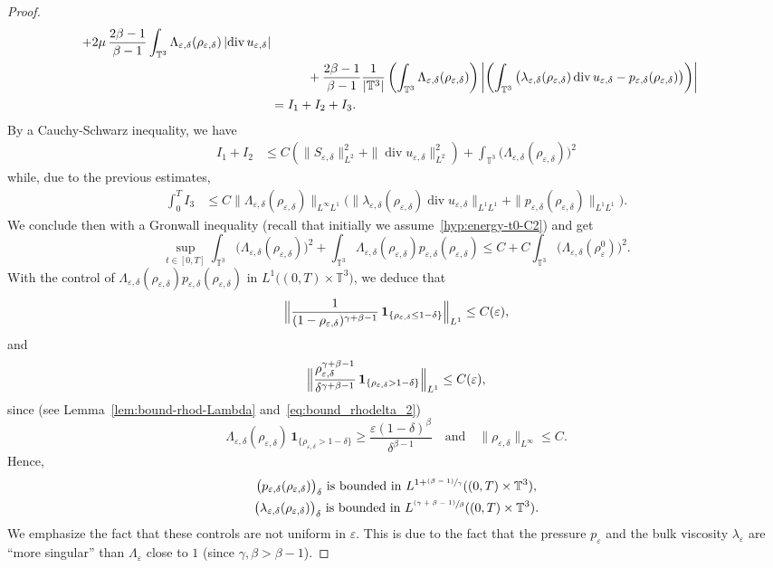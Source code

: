 \documentclass[10pt]{amsart}
\newcommand{\<}{\bigl\langle}
\renewcommand{\>}{\bigr\rangle}
\newcommand{\psfrac}[2]{\sfrac{(#1)}{#2}}
\newcommand{\labeleq}[1]{}
\theoremstyle{definition}
\theoremstyle{remark}
\newcommand{\TT}{\mathbb{T}^3}
\DeclareMathOperator{\Div}{div}
\let\ep\varepsilon
\begin{document}
\begin{proof}
\begin{align*}
+ 2\mu\,\dfrac{2\beta -1}{\beta-1} \int_{\TT}{\Lambda_{\ep,\delta}(\rho_{\ep,\delta})\,
| {\Div u_{\ep,\delta}}|} \\
&
\hspace*{1cm}+ \dfrac{2\beta -1}{\beta-1} \dfrac{1}{|\TT|}\left(\int_{\TT}{\Lambda_{\ep,\delta}(\rho_{\ep,\delta})}\right) \biggl|\left(\int_{\TT}{\big(\lambda_{\ep,\delta}(\rho_{\ep,\delta})\Div u_{\ep,\delta} - p_{\ep,\delta} (\rho_{\ep,\delta})\big)} \right) \biggr| \\
& = I_1 + I_2 + I_3.
\end{align*}
By a Cauchy-Schwarz inequality, we have
\begin{align*}
I_1 + I_2
& \leq C (\|S_{\ep,\delta}\|_{L^2}^2 + \|{\Div u_{\ep,\delta}}\|_{L^2}^2) + \int_{\TT}{\big(\Lambda_{\ep,\delta}(\rho_{\ep,\delta})\big)^{2}}
\end{align*}
while, due to the previous estimates,
\begin{align*}
\int_0^T I_3
& \leq C \|\Lambda_{\ep,\delta}(\rho_{\ep,\delta})\|_{L^\infty L^1}
\big(\|\lambda_{\ep,\delta}(\rho_{\ep,\delta})\Div u_{\ep,\delta}\|_{L^1L^1} + \|p_{\ep,\delta} (\rho_{\ep,\delta})\|_{L^1L^1} \big).
\end{align*}
We conclude then with a Gronwall inequality (recall that initially we assume~\eqref{hyp:energy-t0-C2}) and get
\begin{equation*}
\sup_{t \in [0,T]}\int_{\TT}{\big(\Lambda_{\ep,\delta}(\rho_{\ep,\delta})\big)^{2}}
+ \int_{\TT}{\Lambda_{\ep,\delta}(\rho_{\ep,\delta}) p_{\ep,\delta} (\rho_{\ep,\delta})}
\leq C + C\int_{\TT}{\big(\Lambda_{\ep,\delta}(\rho_{\ep}^0)\big)^{2}}.
\end{equation*}
With the control of $\Lambda_{\ep,\delta}(\rho_{\ep,\delta}) p_{\ep,\delta}(\rho_{\ep,\delta})$ in $L^1\big((0,T)\times \TT\big)$, we deduce that
\[
\Bigl\|\dfrac{1}{(1-\rho_{\ep,\delta})^{\gamma + \beta-1} }\,\mathbf{1}_{\{ \rho_{\ep,\delta} \leq 1-\delta \}} \Bigr\|_{L^1} \leq C(\ep),
\]
and
\[
\Bigl\|\dfrac{\rho_{\ep,\delta}^{\gamma + \beta -1}}{\delta^{\gamma+ \beta-1}} \,\mathbf{1}_{\{ \rho_{\ep,\delta} > 1-\delta \}} \Bigr\|_{L^1} \leq C(\ep),
\]
since (see Lemma~\ref{lem:bound-rhod-Lambda} and~\eqref{eq:bound_rhodelta_2})
\[
\Lambda_{\ep,\delta}(\rho_{\ep,\delta})\,\mathbf{1}_{\{ \rho_{\ep,\delta} > 1-\delta \}}
\geq \dfrac{\ep (1-\delta)^\beta}{\delta^{\beta-1}}
\quad \text{and} \quad
\|\rho_{\ep,\delta}\|_{L^\infty} \leq C.
\]
Hence,
\begin{gather}\labeleq{pdelta2}
\big(p_{\ep,\delta}(\rho_{\ep,\delta})\big)_\delta ~ \text{is bounded in} ~ L^{1 + \psfrac{\beta-1}{\gamma}}((0,T)\times \TT),\notag\\
\label{eq:lambdadelta2}
\big(\lambda_{\ep,\delta}(\rho_{\ep,\delta})\big)_\delta ~ \text{is bounded in} ~ L^{\psfrac{\gamma + \beta - 1}{\beta}}((0,T)\times \TT).
\end{gather}
We emphasize the fact that these controls are not uniform in $\ep$.
This is due to the fact that the pressure $p_\ep$ and the bulk viscosity $\lambda_\ep$ are ``more singular'' than $\Lambda_\ep$ close to $1$ (since $\gamma, \beta > \beta-1$).
\end{proof}
\end{document}
